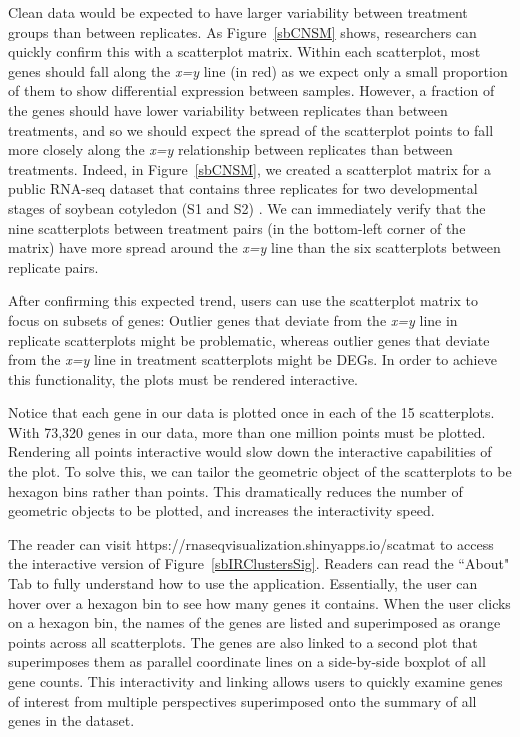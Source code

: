 \documentclass{bioinfo}
\begin{document}
Clean data would be expected to have larger variability between treatment groups than between replicates. As Figure~\ref{sbCNSM} shows, researchers can quickly confirm this with a scatterplot matrix. Within each scatterplot, most genes should fall along the \textit{x=y} line (in red) as we expect only a small proportion of them to show differential expression between samples. However, a fraction of the genes should have lower variability between replicates than between treatments, and so we should expect the spread of the scatterplot points to fall more closely along the \textit{x=y} relationship between replicates than between treatments. Indeed, in Figure~\ref{sbCNSM}, we created a scatterplot matrix for a public RNA-seq dataset that contains three replicates for two developmental stages of soybean cotyledon (S1 and S2) \citep{Brown}. We can immediately verify that the nine scatterplots between treatment pairs (in the bottom-left corner of the matrix) have more spread around the \textit{x=y} line than the six scatterplots between replicate pairs.

After confirming this expected trend, users can use the scatterplot matrix to focus on subsets of genes: Outlier genes that deviate from the \textit{x=y} line in replicate scatterplots might be problematic, whereas outlier genes that deviate from the \textit{x=y} line in treatment scatterplots might be DEGs. In order to achieve this functionality, the plots must be rendered interactive.

Notice that each gene in our data is plotted once in each of the 15 scatterplots. With 73,320 genes in our data, more than one million points must be plotted. Rendering all points interactive would slow down the interactive capabilities of the plot. To solve this, we can tailor the geometric object of the scatterplots to be hexagon bins rather than points. This dramatically reduces the number of geometric objects to be plotted, and increases the interactivity speed.

The reader can visit https://rnaseqvisualization.shinyapps.io/scatmat to access the interactive version of Figure~\ref{sbIRClustersSig}. Readers can read the ``About" Tab to fully understand how to use the application. Essentially, the user can hover over a hexagon bin to see how many genes it contains. When the user clicks on a hexagon bin, the names of the genes are listed and superimposed as orange points across all scatterplots. The genes are also linked to a second plot that superimposes them as parallel coordinate lines on a side-by-side boxplot of all gene counts. This interactivity and linking allows users to quickly examine genes of interest from multiple perspectives superimposed onto the summary of all genes in the dataset.
\end{document}
